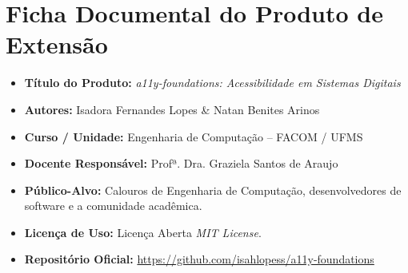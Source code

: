 \documentclass[12pt,a4paper]{article}
\begin{document}
\section{Ficha Documental do Produto de Extensão}
\begin{itemize}
    \item \textbf{Título do Produto:} \textit{a11y-foundations: Acessibilidade em Sistemas Digitais}
    \item \textbf{Autores:} Isadora Fernandes Lopes \& Natan Benites Arinos
    \item \textbf{Curso / Unidade:} Engenharia de Computação -- FACOM / UFMS
    \item \textbf{Docente Responsável:} Profª. Dra. Graziela Santos de Araujo
    \item \textbf{Público-Alvo:} Calouros de Engenharia de Computação, desenvolvedores de software e a comunidade acadêmica.
    \item \textbf{Licença de Uso:} Licença Aberta \textit{MIT License}.
    \item \textbf{Repositório Oficial:} \url{https://github.com/isahlopess/a11y-foundations}
\end{itemize}



\end{document}
